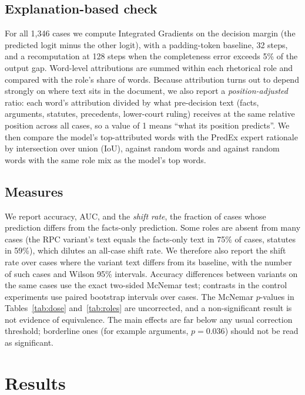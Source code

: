 \documentclass[conference]{IEEEtran}
\begin{document}
\subsection{Explanation-based check}
\label{sec:igproc}
For all 1,346 cases we compute Integrated Gradients \cite{sundararajan2017axiomatic} on the decision margin (the predicted logit minus the other logit), with a padding-token baseline, 32 steps, and a recomputation at 128 steps when the completeness error exceeds 5\% of the output gap. Word-level attributions are summed within each rhetorical role and compared with the role's share of words. Because attribution turns out to depend strongly on where text sits in the document, we also report a \textit{position-adjusted} ratio: each word's attribution divided by what pre-decision text (facts, arguments, statutes, precedents, lower-court ruling) receives at the same relative position across all cases, so a value of 1 means ``what its position predicts''. We then compare the model's top-attributed words with the PredEx expert rationale by intersection over union (IoU), against random words and against random words with the same role mix as the model's top words.

\subsection{Measures}
We report accuracy, AUC, and the \textit{shift rate}, the fraction of cases whose prediction differs from the facts-only prediction. Some roles are absent from many cases (the RPC variant's text equals the facts-only text in 75\% of cases, statutes in 59\%), which dilutes an all-case shift rate. We therefore also report the shift rate over cases where the variant text differs from its baseline, with the number of such cases and Wilson 95\% intervals. Accuracy differences between variants on the same cases use the exact two-sided McNemar test; contrasts in the control experiments use paired bootstrap intervals over cases. The McNemar $p$-values in Tables~\ref{tab:dose} and~\ref{tab:roles} are uncorrected, and a non-significant result is not evidence of equivalence. The main effects are far below any usual correction threshold; borderline ones (for example arguments, $p=0.036$) should not be read as significant.

\section{Results}
\label{sec:results}
\end{document}
